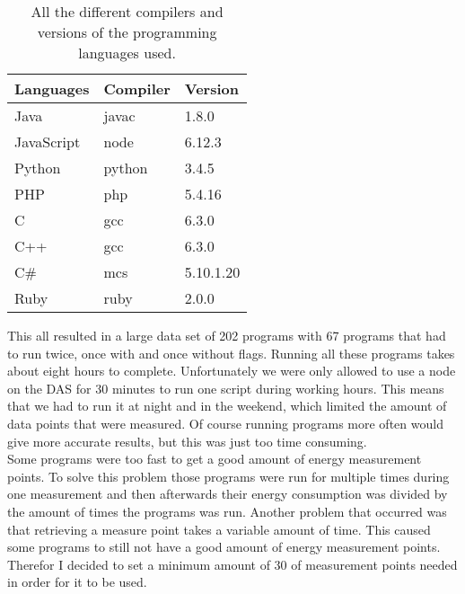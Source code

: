 \begin{table}[h]
\centering
\begin{tabular}{|l|l|l|}
\hline
\textbf{Languages}  & \textbf{Compiler} & \textbf{Version}   \\ \hline
Java       & javac    & 1.8.0\textunderscore161 \\ \hline
JavaScript & node     & 6.12.3    \\ \hline
Python     & python   & 3.4.5     \\ \hline
PHP        & php      & 5.4.16    \\ \hline
C          & gcc      & 6.3.0     \\ \hline
C++        & gcc      & 6.3.0     \\ \hline
C\#         & mcs      & 5.10.1.20 \\ \hline
Ruby       & ruby     & 2.0.0     \\ \hline
\end{tabular}
\caption{All the different compilers and versions of the programming languages used.}
\label{tab:version}
\end{table}

This all resulted in a large data set of 202 programs with 67 programs that had to run twice, once with and once without flags. Running all these programs takes about eight hours to complete. Unfortunately we were only allowed to use a node on the DAS for 30 minutes to run one script during working hours. This means that we had to run it at night and in the weekend, which limited the amount of data points that were measured. Of course running programs more often would give more accurate results, but this was just too time consuming.\\

Some programs were too fast to get a good amount of energy measurement points. To solve this problem those programs were run for multiple times during one measurement and then afterwards their energy consumption was divided by the amount of times the programs was run. Another problem that occurred was that retrieving a measure point takes a variable amount of time. This caused some programs to still not have a good amount of energy measurement points. Therefor I decided to set a minimum amount of 30 of measurement points needed in order for it to be used. \\

